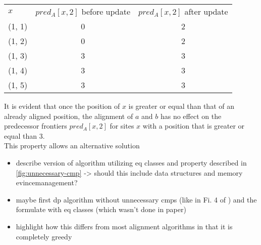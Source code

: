 \begin{table}[h]
	\centering
	\begin{tabular}{l c c}
		$x$ & $pred_A[x, 2]$ before update &  $pred_A[x, 2]$ after update\\
		(1, 1) & 0 & 2 \\
		(1, 2) & 0 & 2 \\
		(1, 3) & 3 & 3 \\
		(1, 4) & 3 & 3 \\
		(1, 5) & 3 & 3 \\
	\end{tabular}
	\label{}
\end{table}

It is evident that once the position of $x$ is greater or equal than that of an already aligned position, the alignment of $a$ and $b$ has no effect on the predecessor frontiers $pred_A[x, 2]$ for sites $x$ with a position that is greater or equal than $3$.\\
This property allows an alternative solution 

\begin{itemize}
	\item describe version of algorithm utilizing eq classes and property described in \ref{fig:unnecessary-cmp} -> should this include data structures and memory evincemanagement?
	\item maybe first dp algorithm without unnecessary cmps (like in Fi. 4 of \cite{abdeddaim1997incremental}) and the formulate with eq classes (which wasn't done in paper) 
	\item highlight how this differs from most alignment algorithms in that it is completely greedy
\end{itemize}
